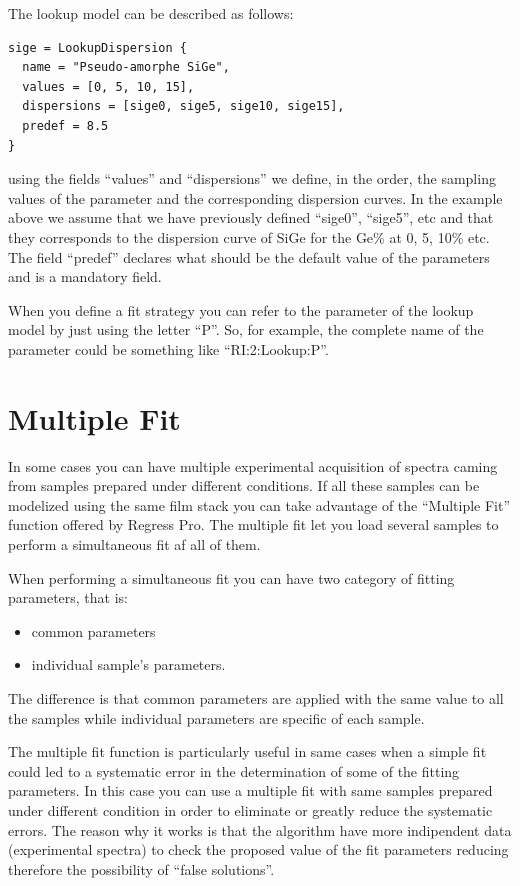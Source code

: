 \documentclass[a4paper]{report}
\begin{document}
The lookup model can be described as follows:
\begin{verbatim}
sige = LookupDispersion { 
  name = "Pseudo-amorphe SiGe",
  values = [0, 5, 10, 15],
  dispersions = [sige0, sige5, sige10, sige15],
  predef = 8.5
}
\end{verbatim}
using the fields ``values'' and ``dispersions'' we define, in the order, the sampling values of the parameter and the corresponding dispersion curves.
In the example above we assume that we have previously defined ``sige0'', ``sige5'', etc and that they corresponds to the dispersion curve of SiGe for the Ge\% at 0, 5, 10\% etc.
The field ``predef'' declares what should be the default value of the parameters and is a mandatory field.

When you define a fit strategy you can refer to the parameter of the lookup model by just using the letter ``P''.
So, for example, the complete name of the parameter could be something like ``RI:2:Lookup:P''.

\chapter{Multiple Fit}

In some cases you can have multiple experimental acquisition of spectra caming from samples prepared under different conditions.
If all these samples can be modelized using the same film stack you can take advantage of the ``Multiple Fit'' function offered by Regress Pro.
The multiple fit let you load several samples to perform a simultaneous fit af all of them.

When performing a simultaneous fit you can have two category of fitting parameters, that is:
\begin{itemize}
  \item common parameters
  \item individual sample's parameters.
\end{itemize}
The difference is that common parameters are applied with the same value to all the samples while individual parameters are specific of each sample.

The multiple fit function is particularly useful in same cases when a simple fit could led to a systematic error in the determination of some of the fitting parameters.
In this case you can use a multiple fit with same samples prepared under different condition in order to eliminate or greatly reduce the systematic errors.
The reason why it works is that the algorithm have more indipendent data (experimental spectra) to check the proposed value of the fit parameters reducing therefore the possibility of ``false solutions''.
\end{document}
